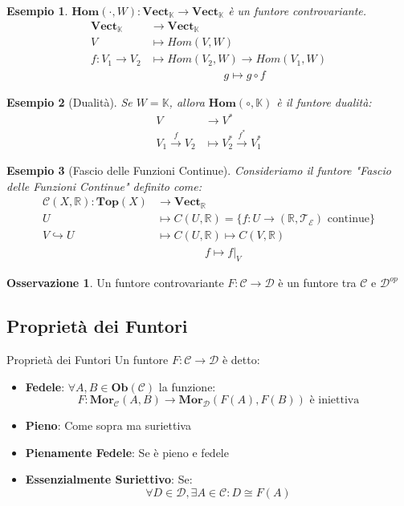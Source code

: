 \documentclass[11pt,a4paper,twoside]{article}
\newtheorem{es}{Esempio}
\theoremstyle{definition}
\newtheorem*{oss}{Osservazione}
\begin{document}
\begin{es}
	$\bm{Hom}(\cdot, W): \bm{Vect}_\mathbb K \to \bm{Vect}_\mathbb K$ è un funtore controvariante.
	\begin{align*}
		\bm{Vect}_\mathbb K & \to \bm{Vect}_\mathbb K\\
		V & \mapsto Hom(V, W)\\
		f:V_1 \to V_2 & \mapsto Hom(V_2, W)  \to Hom(V_1,W)\\
		&\qquad \qquad \qquad \; \; g \mapsto g \circ f
	\end{align*}
\end{es}

\begin{es}[Dualità]
	Se $W = \mathbb K$, allora $\bm{Hom}(\circ, \mathbb K)$ è il funtore dualità:
	\begin{align*}
		V & \to V^*\\
		V_1 \xrightarrow f V_2 & \mapsto V_2^* \xrightarrow{f^*} V_1^*
	\end{align*}
\end{es}

\begin{es}[Fascio delle Funzioni Continue]
	Consideriamo il funtore "Fascio delle Funzioni Continue" definito come:
	\begin{align*}
		\mathcal C(X, \mathbb R): \bm{Top}(X) & \to \bm{Vect}_\mathbb R\\
		U & \mapsto C(U, \mathbb R) = \{f:U \to (\mathbb R, \mathcal T_\mathcal E) \text{ continue}\}\\
		V \hookrightarrow U & \mapsto C(U, \mathbb R) \mapsto C(V,\mathbb R)\\
		& \qquad \qquad \; f \mapsto f|_V
	\end{align*}
\end{es}

\begin{oss}
	Un funtore controvariante $F: \mathcal C \to \mathcal D$ è un funtore tra $\mathcal C$ e $\mathcal D^{op}$
\end{oss}

\subsection{Proprietà dei Funtori}

\begin{defn}{Proprietà dei Funtori}{}
	Un funtore $F: \mathcal C \to \mathcal D$ è detto:
	\begin{itemize}
		\item \textbf{Fedele}: $\forall A, B \in \bm{Ob}(\mathcal C)$ la funzione:
			\[ F:\bm{Mor}_\mathcal C(A,B) \to \bm{Mor}_\mathcal D(F(A), F(B)) \text{ è iniettiva}\]
		\item \textbf{Pieno}: Come sopra ma suriettiva
		\item \textbf{Pienamente Fedele}: Se è pieno e fedele
		\item \textbf{Essenzialmente Suriettivo}: Se:
			\[ \forall D \in \mathcal D, \exists A \in \mathcal C: D \cong F(A) \]
	\end{itemize}
\end{defn}
\end{document}
